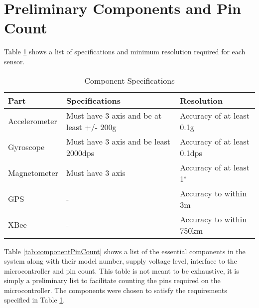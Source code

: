 \section{Preliminary Components and Pin Count}

Table \ref{tab:sensorResolution} shows a list of specifications and minimum resolution required for each sensor.

\begin{table}[H]
\setlength{\extrarowheight}{1.5pt}
  \centering
  \caption{Component Specifications}
    \begin{tabular}{|m{1in}|m{2.2in}|m{2.2in}|}
    \hline
     Part  &  Specifications &  Resolution \\
    \hline \hline
    Accelerometer & Must have 3 axis and be at least +/- 200g & Accuracy of at least 0.1g \\ \hline
    Gyroscope & Must have 3 axis and be least 2000dps & Accuracy of at least 0.1dps \\ \hline
    Magnetometer & Must have 3 axis  & Accuracy of at least 1$^{\circ}$ \\ \hline
    GPS   & - & Accuracy to within 3m  \\ \hline 
    XBee  & - & Accuracy to within 750km \\ \hline
    
    \end{tabular}%
  \label{tab:sensorResolution}%
\end{table}%

Table \ref{tab:componentPinCount} shows a list of the essential components in the system along with their model number, supply voltage level, interface to the microcontroller and pin count.  This table is not meant to be exhaustive, it is simply a preliminary list to facilitate counting the pins required on the microcontroller. The components were chosen to satisfy the requirements specified in Table \ref{tab:sensorResolution}.

